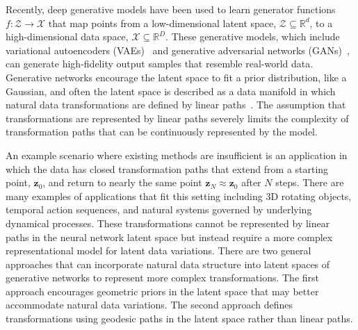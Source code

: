 \documentclass[letterpaper]{article} %
\newcommand{\vtr}[1]{\ensuremath{\mathbf{#1}}}
\begin{document}
Recently, deep generative models have been used to learn generator functions $f : \mathcal{Z} \rightarrow \mathcal{X}$ that map points from a low-dimensional latent space, $\mathcal{Z} \subseteq \mathbb{R}^d$,  to a high-dimensional data space, $\mathcal{X} \subseteq \mathbb{R}^D$. These generative models, which include variational autoencoders (VAEs)~\cite{kingma2013auto} and generative adversarial networks (GANs)~\cite{goodfellow2014generative}, can generate high-fidelity output samples that resemble real-world data. Generative networks encourage the latent space to fit a prior distribution, like a Gaussian, and often the latent space is described as a data manifold in which natural data transformations are defined by linear paths~\cite{radford2015unsupervised}. The assumption that transformations are represented by linear paths severely limits the complexity of transformation paths that can be continuously represented by the model.

An example scenario where existing methods are insufficient is an application in which the data has closed transformation paths that extend from a starting point, $\vtr{z}_0$, and return to nearly the same point $\vtr{z}_N \approx \vtr{z}_0$ after $N$ steps. There are many examples of applications that fit this setting including 3D rotating objects, temporal action sequences, and natural systems governed by underlying dynamical processes. These transformations cannot be represented by linear paths in the neural network latent space but instead require a more complex representational model for latent data variations. There are two general approaches that can incorporate natural data structure into latent spaces of generative networks to represent more complex transformations. The first approach encourages geometric priors in the latent space that may better accommodate natural data variations. The second approach defines transformations using geodesic paths in the latent space rather than linear paths.
\end{document}
